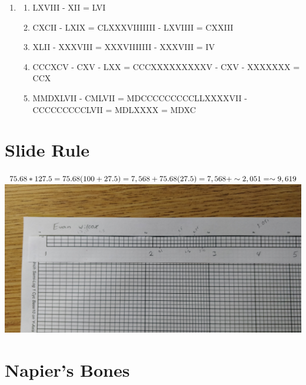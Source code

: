\documentclass[a4paper]{article}
\begin{document}
\begin{enumerate}
        \item
        \begin{enumerate}
            \item LXVIII - XII = LVI
            \item CXCII - LXIX = CLXXXVIIIIIII - LXVIIII = CXXIII
            \item XLII - XXXVIII = XXXVIIIIIII - XXXVIII = IV
            \item CCCXCV - CXV - LXX = CCCXXXXXXXXXV - CXV - XXXXXXX = CCX
            \item MMDXLVII - CMLVII = MDCCCCCCCCCLLXXXXVII - CCCCCCCCCLVII = MDLXXXX = MDXC
        \end{enumerate}

    \end{enumerate}

    \newpage

    \section{Slide Rule}

    $75.68 * 127.5 \\ = 75.68(100 + 27.5) \\ = 7,568 + 75.68(27.5) \\ = 7,568+ \sim 2,051 \\ = \sim 9,619 \\$
    \includegraphics[scale=0.08]{2}

    \section{Napier's Bones}
\end{document}
